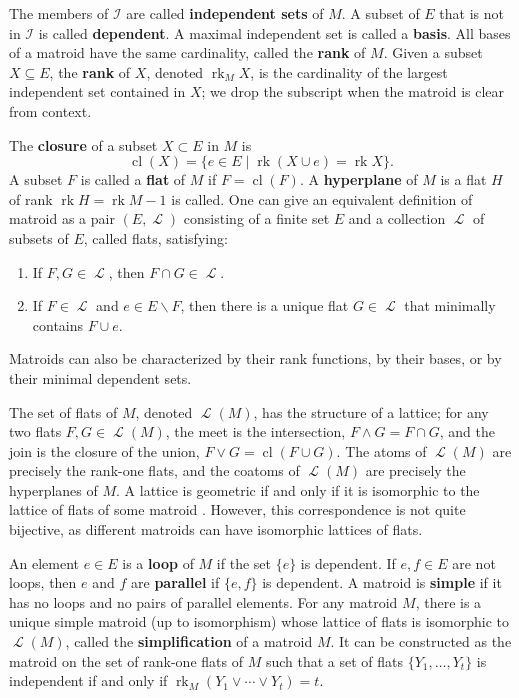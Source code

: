 \documentclass[11pt, reqno]{amsart}
\DeclareMathOperator{\cl}{cl}
\DeclareMathOperator{\LL}{\mathcal{L}}
\DeclareMathOperator{\rk}{rk}
\newcommand{\term}[1]{\textbf{\textsf{#1}}}
\theoremstyle{definition}
\numberwithin{equation}{section}
\numberwithin{table}{section}
\begin{document}
\begin{spacing}{1.1}
The members of $\mathcal{I}$ are called \term{independent sets} of $M$.  A subset of $E$ that is not in $\mathcal{I}$ is called \term{dependent}.  A maximal independent set is called a \term{basis}.  All bases of a matroid have the same cardinality, called the \term{rank} of $M$.  Given a subset $X \subseteq E$, the \term{rank} of $X$, denoted $\rk_M X$, is the cardinality of the largest independent set contained in $X$; we drop the subscript when the matroid is clear from context.  

The \term{closure} of a subset $X \subset E$ in $M$ is 
\[ \cl(X) = \{e \in E \mid \rk(X \cup e) = \rk X \}.\]  
A subset $F$ is called a \term{flat} of $M$ if $F = \cl(F)$.  A \term{hyperplane} of $M$ is a flat $H$ of rank $\rk H = \rk M - 1$ is called.  One can give an equivalent definition of matroid as a pair $(E,\LL)$ consisting of a finite set $E$ and a collection $\LL$ of subsets of $E$, called flats, satisfying:
\begin{enumerate}
    \item If $F,G \in \LL$, then $F \cap G \in \LL$.
    \item If $F \in \LL$ and $e \in E \smallsetminus F$, then there is a unique flat $G \in \LL$ that minimally contains $F \cup e$.
\end{enumerate}
Matroids can also be characterized by their rank functions, by their bases, or by their minimal dependent sets.

The set of flats of $M$, denoted $\LL(M)$, has the structure of a lattice; for any two flats $F,G \in \LL(M)$, the meet is the intersection, $F \wedge G = F \cap G$, and the join is the closure of the union, $F \vee G = \cl(F \cup G)$.  The atoms of $\LL(M)$ are precisely the rank-one flats, and the coatoms of $\LL(M)$ are precisely the hyperplanes of $M$.  A lattice is geometric if and only if it is isomorphic to the lattice of flats of some matroid \cite[Theorem 1.7.5]{Oxl11}.  However, this correspondence is not quite bijective, as different matroids can have isomorphic lattices of flats. 

An element $e \in E$ is a \term{loop} of $M$ if the set $\{e\}$ is dependent.  
If $e,f \in E$ are not loops, then $e$ and $f$ are \term{parallel} if $\{e,f\}$ is dependent.  A matroid is \term{simple} if it has no loops and no pairs of parallel elements.  For any matroid $M$, there is a unique simple matroid (up to isomorphism) whose lattice of flats is isomorphic to $\LL(M)$, called the  \term{simplification} of a matroid $M$.  It can be constructed as the matroid on the set of rank-one flats of $M$ such that a set of flats $\{Y_1, \dots,Y_t\}$ is independent if and only if $\rk_M(Y_1 \vee \cdots \vee Y_t) = t$.  


\end{spacing}
\end{document}
